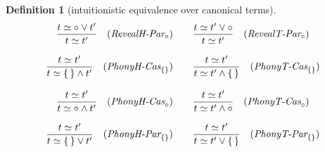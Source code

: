 \documentclass[12pt]{article}
\newtheorem{Definition}{Definition}[section]
\begin{document}
\begin{Definition}[intuitionistic equivalence over canonical terms]
\begin{displaymath}
\begin{array}{c}
      \begin{array}{ll}
        \begin{array}{rl}
          \dfrac{ t \simeq \circ \vee t' }{
            t \simeq t'
          }  &  (\text{\it RevealH-Par}_\circ)
        \end{array}
        & \begin{array}{rl}
            \dfrac{ t \simeq t' \vee \circ }{
              t \simeq t'
            }  &  (\text{\it RevealT-Par}_\circ)
          \end{array}
      \end{array}  \\
      \\
      
      \begin{array}{ll}
        \begin{array}{rl}
          \dfrac{ t \simeq t' }{
            t \simeq \{\,\} \wedge t'
          }  &  (\text{\it PhonyH-Cas}_{\{\}})
        \end{array}
        & \begin{array}{rl}
            \dfrac{ t \simeq t' }{
              t \simeq t' \wedge \{\,\}
            }  &  (\text{\it PhonyT-Cas}_{\{\}})
          \end{array}
      \end{array}  \\
      \\
      
      \begin{array}{ll}
        \begin{array}{rl}
          \dfrac{ t \simeq t' }{
            t \simeq \circ \wedge t'
          }  &  (\text{\it PhonyH-Cas}_\circ)
        \end{array}
        & \begin{array}{rl}
            \dfrac{ t \simeq t' }{
              t \simeq t' \wedge \circ
            }  &  (\text{\it PhonyT-Cas}_\circ)
          \end{array}
      \end{array}  \\
      \\
            
      \begin{array}{ll}
        \begin{array}{rl}
          \dfrac{ t \simeq t' }{
            t \simeq \{\,\} \vee t'
          }  &  (\text{\it PhonyH-Par}_{\{\}})
        \end{array}
        & \begin{array}{rl}
            \dfrac{ t \simeq t' }{
              t \simeq t' \vee \{\,\}
            }  &  (\text{\it PhonyT-Par}_{\{\}})
          \end{array}
      \end{array}  \\
      \\


\end{array}
\end{displaymath}
\end{Definition}
\end{document}
